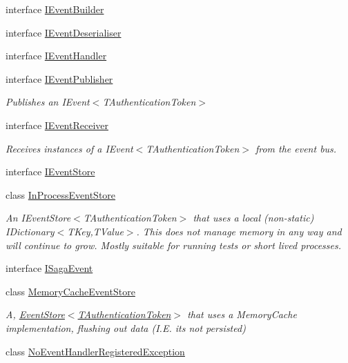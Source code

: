 \begin{DoxyCompactItemize}
interface \hyperlink{interfaceCqrs_1_1Events_1_1IEventBuilder}{I\+Event\+Builder}
\item 
interface \hyperlink{interfaceCqrs_1_1Events_1_1IEventDeserialiser}{I\+Event\+Deserialiser}
\item 
interface \hyperlink{interfaceCqrs_1_1Events_1_1IEventHandler}{I\+Event\+Handler}
\item 
interface \hyperlink{interfaceCqrs_1_1Events_1_1IEventPublisher}{I\+Event\+Publisher}
\begin{DoxyCompactList}\small\item\em Publishes an I\+Event$<$\+T\+Authentication\+Token$>$ \end{DoxyCompactList}\item 
interface \hyperlink{interfaceCqrs_1_1Events_1_1IEventReceiver}{I\+Event\+Receiver}
\begin{DoxyCompactList}\small\item\em Receives instances of a I\+Event$<$\+T\+Authentication\+Token$>$ from the event bus. \end{DoxyCompactList}\item 
interface \hyperlink{interfaceCqrs_1_1Events_1_1IEventStore}{I\+Event\+Store}
\item 
class \hyperlink{classCqrs_1_1Events_1_1InProcessEventStore}{In\+Process\+Event\+Store}
\begin{DoxyCompactList}\small\item\em An I\+Event\+Store$<$\+T\+Authentication\+Token$>$ that uses a local (non-\/static) I\+Dictionary$<$\+T\+Key,\+T\+Value$>$. This does not manage memory in any way and will continue to grow. Mostly suitable for running tests or short lived processes. \end{DoxyCompactList}\item 
interface \hyperlink{interfaceCqrs_1_1Events_1_1ISagaEvent}{I\+Saga\+Event}
\item 
class \hyperlink{classCqrs_1_1Events_1_1MemoryCacheEventStore}{Memory\+Cache\+Event\+Store}
\begin{DoxyCompactList}\small\item\em A, \hyperlink{classCqrs_1_1Events_1_1EventStore_a6346cb2aea4c5b4e740dc6cfb15abab8_a6346cb2aea4c5b4e740dc6cfb15abab8}{Event\+Store$<$\+T\+Authentication\+Token$>$} that uses a Memory\+Cache implementation, flushing out data (I.\+E. it\textquotesingle{}s not persisted) \end{DoxyCompactList}\item 
class \hyperlink{classCqrs_1_1Events_1_1NoEventHandlerRegisteredException}{No\+Event\+Handler\+Registered\+Exception}

\end{DoxyCompactItemize}
